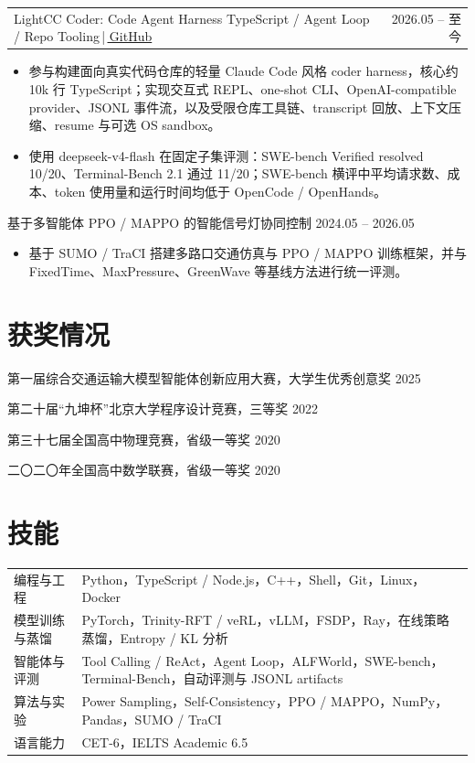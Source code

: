 \documentclass[11pt,a4paper]{ctexart}
\makeatletter
\newcommand{\entrytitlefont}{\fontsize{10.8pt}{12.2pt}\selectfont\heiti\color{main}}
\newcommand{\bodyfont}{\fontsize{9.8pt}{11.8pt}\selectfont\songti\color{main}}
\newcommand{\metafont}[1]{{\fontsize{9.5pt}{11pt}\selectfont\songti\color{sub}#1}}
\newcommand{\awardfont}{\fontsize{9.8pt}{11.6pt}\selectfont\songti\color{main}}
\newcommand{\projecttitle}[1]{{\entrytitlefont #1}}
\newcommand{\projectwithlink}[4]{
  \noindent
  \begin{tabular*}{\linewidth}{@{}l@{\extracolsep{\fill}}r@{}}
    \projecttitle{#1} {\bodyfont\color{main}{\color{sub}\,|\,}#3{\color{sub}\,|\,}\href{#4}{\textcolor{main}{\raisebox{-0.08em}{\faGithub}\,GitHub}}} &
    \metafont{#2} \\
  \end{tabular*}\par
  \vspace{-0.02em}
}
\newcommand{\compactproject}[2]{
  \noindent
  \projecttitle{#1} \hfill \metafont{#2}\par
  \vspace{-0.02em}
}
\newcommand{\awarditem}[2]{
  \noindent
  {\awardfont #1 \hfill {\color{sub}#2}}\par
  \vspace{0.02em}
}
\makeatother
\begin{document}
\projectwithlink
{LightCC Coder: Code Agent Harness}
{2026.05 -- 至今}
{TypeScript / Agent Loop / Repo Tooling}
{https://github.com/Sisyphe-lee/light-cc-coder/tree/main}

\begin{itemize}
  \item 参与构建面向真实代码仓库的轻量 Claude Code 风格 coder harness，核心约 10k 行 TypeScript；实现交互式 REPL、one-shot CLI、OpenAI-compatible provider、JSONL 事件流，以及受限仓库工具链、transcript 回放、上下文压缩、resume 与可选 OS sandbox。
  \item 使用 deepseek-v4-flash 在固定子集评测：SWE-bench Verified resolved 10/20、Terminal-Bench 2.1 通过 11/20；SWE-bench 横评中平均请求数、成本、token 使用量和运行时间均低于 OpenCode / OpenHands。
\end{itemize}

\vspace{0.16em}

\compactproject
{基于多智能体 PPO / MAPPO 的智能信号灯协同控制}
{2024.05 -- 2026.05}

\begin{itemize}
  \item 基于 SUMO / TraCI 搭建多路口交通仿真与 PPO / MAPPO 训练框架，并与 FixedTime、MaxPressure、GreenWave 等基线方法进行统一评测。
\end{itemize}

\vspace{0.10em}

\section{获奖情况}

\awarditem
{第一届综合交通运输大模型智能体创新应用大赛，大学生优秀创意奖}
{2025}

\awarditem
{第二十届“九坤杯”北京大学程序设计竞赛，三等奖}
{2022}

\awarditem
{第三十七届全国高中物理竞赛，省级一等奖}
{2020}

\awarditem
{二〇二〇年全国高中数学联赛，省级一等奖}
{2020}

\section{技能}

{\bodyfont
\begin{tabularx}{\linewidth}{>{\heiti}p{3.1cm}X}
编程与工程 & Python，TypeScript / Node.js，C++，Shell，Git，Linux，Docker\\
模型训练与蒸馏 & PyTorch，Trinity-RFT / veRL，vLLM，FSDP，Ray，在线策略蒸馏，Entropy / KL 分析\\
智能体与评测 & Tool Calling / ReAct，Agent Loop，ALFWorld，SWE-bench，Terminal-Bench，自动评测与 JSONL artifacts\\
算法与实验 & Power Sampling，Self-Consistency，PPO / MAPPO，NumPy，Pandas，SUMO / TraCI\\
语言能力 & CET-6，IELTS Academic 6.5\\
\end{tabularx}
}
\end{document}
